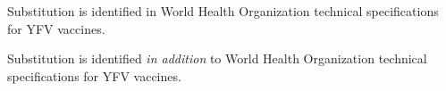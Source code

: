 \documentclass{report}
\begin{document}
\begin{table}
	\centering
	\caption{Consensus substitutions observed between Asibi and the Vaccine strains considered.}
		\begin{ThreePartTable}

		
		\begin{tablenotes}
			\item[a]Substitution is identified in World Health Organization technical specifications for YFV vaccines.
			\item[b]Substitution is identified \emph{in addition} to World Health Organization technical specifications for YFV vaccines.
		\end{tablenotes}
		\end{ThreePartTable}
		\label{my-label}
\end{table}
\end{document}
